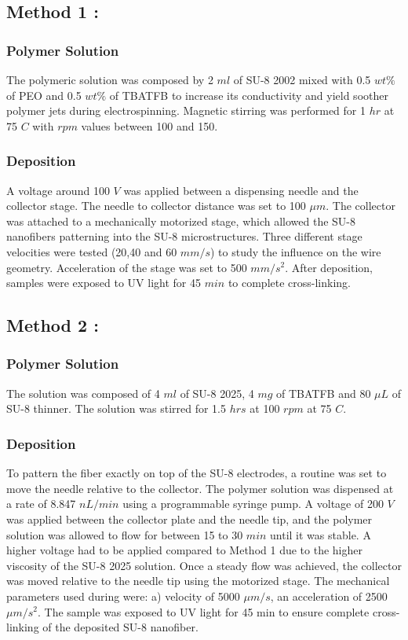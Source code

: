 \subsection{Method 1 : }

\subsubsection{Polymer Solution}
The polymeric solution was composed by 2 $ml$ of SU-8 2002 mixed with 0.5 $w t \%$ of PEO and 0.5 $w t \%$ of TBATFB to increase its conductivity and yield soother polymer jets during electrospinning. Magnetic stirring was performed for 1 $hr$ at 75 \textdegree{}$C$ with $rpm$ values between 100 and 150.

\subsubsection{Deposition}
A voltage around 100 $V$ was applied between a dispensing needle and the collector stage. The needle to collector distance was set to 100 $\mu m$. The collector was attached to a mechanically motorized stage, which allowed the SU-8 nanofibers patterning into the SU-8 microstructures. Three different stage velocities were tested (20,40 and 60 $mm/s$) to study the influence on the wire geometry. Acceleration of the stage was set to 500 $mm/s^{2}$. After deposition, samples were exposed to UV light for 45 $min$ to complete cross-linking.

\subsection{Method 2 : }

\subsubsection{Polymer Solution}
The solution was composed of 4 $ml$ of SU-8 2025, 4 $mg$ of TBATFB and 80 $\mu L$ of SU-8 thinner. The solution was stirred for 1.5 $hrs$ at 100 $rpm$ at 75 \textdegree{}$C$.

\subsubsection{Deposition}
To pattern the fiber exactly on top of the SU-8 electrodes, a routine was set to move the needle relative to the collector. The polymer solution was dispensed at a rate of 8.847 $nL / min$ using a programmable syringe pump. A voltage of 200 $V$ was applied between the collector plate and the needle tip, and the polymer solution was allowed to flow for between 15 to 30 $min$ until it was stable. A higher voltage had to be applied compared to Method 1 due to the higher viscosity of the SU-8 2025 solution. Once a steady flow was achieved, the collector was moved relative to the needle tip using the motorized stage. The mechanical parameters used during were: a) velocity of 5000 $\mu m/s$, an acceleration of 2500 $\mu m/s^{2}$. The sample was exposed to UV light for 45 min to ensure complete cross-linking of the deposited SU-8 nanofiber.


